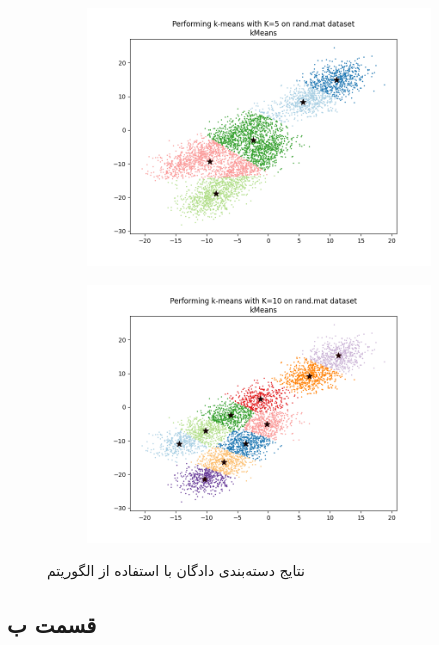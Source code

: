 \documentclass[12pt, a4paper]{article}
\begin{document}
\begin{figure}[h]
\begin{subfigure}{.45\linewidth}
    \end{subfigure}
    \newline
    \begin{subfigure}{.45\linewidth}
        \includegraphics[width=\linewidth]{images/q3/a/5.png}
    \end{subfigure}
    \hfill
    \begin{subfigure}{.45\linewidth}
        \includegraphics[width=\linewidth]{images/q3/a/10.png}
    \end{subfigure}
    \caption{نتایج دسته‌بندی دادگان  با استفاده از الگوریتم }
    \label{kmeans_rand_mat}
\end{figure}

\subsection*{قسمت ب}
\end{document}

